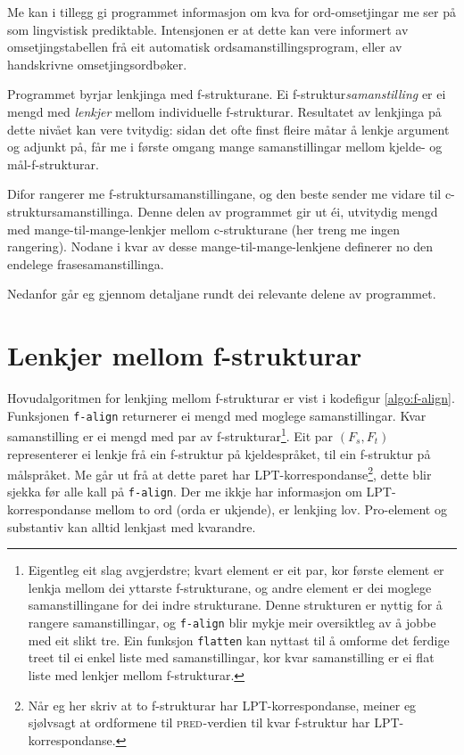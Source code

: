 \documentclass[12pt,a4paper,oneside,draft]{report}
\newcommand{\F}[2]{\textsc{#1}\ensuremath{_{#2}}}
\newcommand{\PRED}{\F{pred}{}}
\begin{document}
Me kan i tillegg gi programmet informasjon om kva for ord-omsetjingar
me ser på som lingvistisk prediktable. Intensjonen er at dette kan
vere informert av omsetjingstabellen frå eit automatisk
ordsamanstillingsprogram, eller av handskrivne omsetjingsordbøker.

Programmet byrjar lenkjinga med f-strukturane. Ei
f-struktur\emph{samanstilling} er ei mengd med \emph{lenkjer} mellom
individuelle f-strukturar. Resultatet av lenkjinga på dette nivået kan
vere tvitydig: sidan det ofte finst fleire måtar å lenkje argument og
adjunkt på, får me i første omgang mange samanstillingar mellom
kjelde- og mål-f-strukturar.

Difor rangerer me f-struktursamanstillingane, og den beste sender me
vidare til c-struktursamanstillinga. Denne delen av programmet gir ut
éi, utvitydig mengd med mange-til-mange-lenkjer mellom c-strukturane
(her treng me ingen rangering). Nodane i kvar av desse
mange-til-mange-lenkjene definerer no den endelege
frasesamanstillinga.

Nedanfor går eg gjennom detaljane rundt dei relevante delene av
programmet.

\section{Lenkjer mellom f-strukturar}
\label{sec-4.1}

\label{SEC:impl-f-lenkjing}

Hovudalgoritmen for lenkjing mellom f-strukturar er vist i kodefigur
\ref{algo:f-align}. Funksjonen \texttt{f-align} returnerer ei mengd med
moglege samanstillingar. Kvar samanstilling er ei mengd med par av
f-strukturar\footnote{Eigentleg eit slag avgjerdstre; kvart element er eit par, kor
        første element er lenkja mellom dei yttarste f-strukturane, og
        andre element er dei moglege samanstillingane for dei indre
        strukturane. Denne strukturen er nyttig for å rangere
        samanstillingar, og \texttt{f-align} blir mykje meir oversiktleg av å
        jobbe med eit slikt tre. Ein funksjon \texttt{flatten} kan nyttast
        til å omforme det ferdige treet til ei enkel liste med
        samanstillingar, kor kvar samanstilling er ei flat liste med
        lenkjer mellom f-strukturar. }. Eit par $(F_s,F_t)$ representerer ei lenkje frå
ein f-struktur på kjeldespråket, til ein f-struktur på målspråket. Me
går ut frå at dette paret har LPT-korrespondanse\footnote{Når eg her skriv at to f-strukturar har LPT-korrespondanse,
        meiner eg sjølvsagt at ordformene til \PRED{}-verdien til kvar
        f-struktur har LPT-korrespondanse. }, dette blir
sjekka før alle kall på \texttt{f-align}. Der me ikkje har informasjon om
LPT-korrespondanse mellom to ord (orda er ukjende), er lenkjing
lov. Pro-element og substantiv kan alltid lenkjast med kvarandre.
\end{document}
